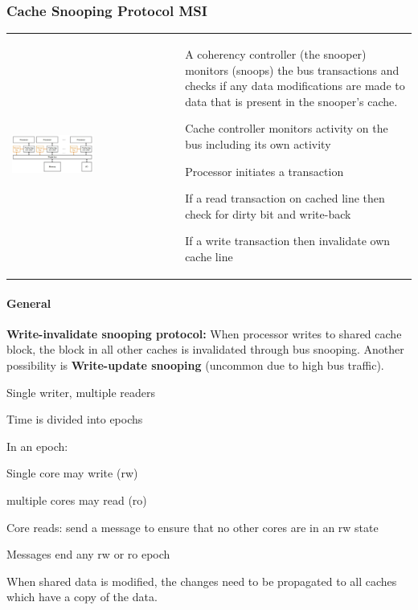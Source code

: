 		\subsubsection{Cache Snooping Protocol MSI }
			\begin{tabular}{p{0.475\textwidth}p{}}
				\vspace{0pt}
				
				\includegraphics[width=0.5\textwidth]{./pictures/cache_snooping.png}
					& A coherency controller (the snooper) monitors (snoops) the bus transactions and checks if any data modifications are made to data that is present in the snooper's cache. 
					\begin{compactitem}
						\item Cache controller monitors activity on the bus including its own activity
						\item Processor initiates a transaction
						\item If a read transaction on cached line then check for dirty bit and write-back
						\item If a write transaction then invalidate own cache line
					\end{compactitem}\\
			\end{tabular}
			
			\paragraph{General}
			\begin{compactitem}
			  	\item \textbf{Write-invalidate snooping protocol:} When processor writes to shared cache block, the block in all other caches is invalidated through bus snooping. Another possibility is \textbf{Write-update snooping} (uncommon due to high bus traffic). 
			  	\item Single writer, multiple readers
			  	\item Time is divided into epochs
			  	\item In an epoch:
			  		\begin{compactitem}
			  	  		\item Single core may write (rw)
			  	  		\item multiple cores may read (ro)
			  	 	\end{compactitem}
				\item Core reads: send a message to ensure that no other cores are in an rw state
				\item Messages end any rw or ro epoch
				\item When shared data is modified, the changes need to be propagated to all caches which have a copy of the data.
			\end{compactitem}
			
